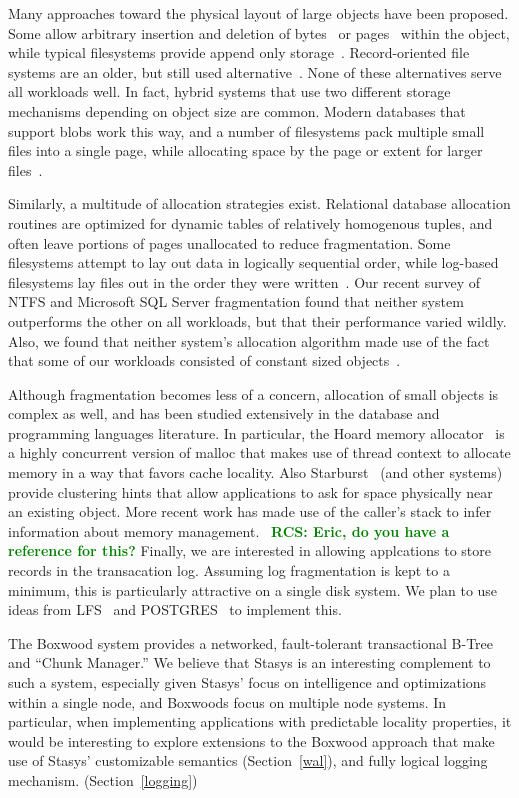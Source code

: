 \documentclass[letterpaper,twocolumn,10pt]{article}
\newcommand{\yad}{Stasys\xspace}
\newcommand{\yads}{Stasys'\xspace}
\newcommand{\rcs}[1]{\textcolor{green}{\bf RCS: #1}}
\begin{document}
Many approaches toward the physical layout of large objects have been
proposed.  Some allow arbitrary insertion and deletion of
bytes~\cite{esm} or pages~\cite{sqlserver} within the object, while
typical filesystems provide append only storage~\cite{ffs,ntfs}.
Record-oriented file systems are an older, but still used
alternative~\cite{multics,gfs}. None of these alternatives serve all
workloads well.  In fact, hybrid systems that use two different
storage mechanisms depending on object size are common.  Modern
databases that support blobs work this way, and a number of
filesystems pack multiple small files into a single page, while
allocating space by the page or extent for larger files~\cite{reiserfs3,didFFSdoThis}.

Similarly, a multitude of allocation strategies exist.  Relational
database allocation routines are optimized for dynamic tables of
relatively homogenous tuples, and often leave portions of pages
unallocated to reduce fragmentation.  Some filesystems attempt to lay
out data in logically sequential order, while log-based filesystems
lay files out in the order they were written~\cite{lfs}.  Our recent
survey of NTFS and Microsoft SQL Server fragmentation found that
neither system outperforms the other on all workloads, but that their
performance varied wildly.  Also, we found that neither system's
allocation algorithm made use of the fact that some of our workloads
consisted of constant sized objects~\cite{msrTechReport}.  

Although fragmentation becomes less of a concern, allocation of small
objects is complex as well, and has been studied extensively in the
database and programming languages literature.  In particular, the
Hoard memory allocator~\cite{hoard} is a highly concurrent version of
malloc that makes use of thread context to allocate memory in a way
that favors cache locality.  Also Starburst~\cite{starburst} (and
other systems) provide clustering hints that allow applications to ask
for space physically near an existing object.  More recent work has
made use of the caller's stack to infer information about memory
management.~\cite{xxx} \rcs{Eric, do you have a reference for this?}
Finally, we are interested in allowing applcations to store records in
the transacation log.  Assuming log fragmentation is kept to a
minimum, this is particularly attractive on a single disk system.  We
plan to use ideas from LFS~\cite{lfs} and POSTGRES~\cite{postgres}
to implement this.

The Boxwood system provides a networked, fault-tolerant transactional
B-Tree and ``Chunk Manager.''  We believe that \yad is an interesting
complement to such a system, especially given \yads focus on
intelligence and optimizations within a single node, and Boxwoods
focus on multiple node systems.  In particular, when implementing
applications with predictable locality properties, it would be
interesting to explore extensions to the Boxwood approach that make
use of \yads customizable semantics (Section~\ref{wal}), and fully logical logging
mechanism. (Section~\ref{logging})
\end{document}
